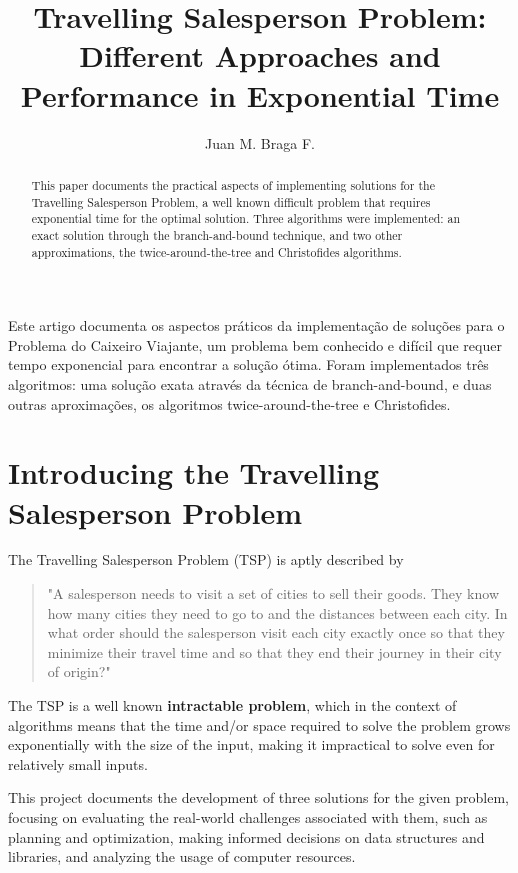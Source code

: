 \documentclass[12pt]{article}
\title{Travelling Salesperson Problem:\\ Different Approaches and Performance in Exponential Time}
\author{Juan M. Braga F.\inst{1}}
\begin{document}
 

\maketitle

\begin{abstract}
  This paper documents the practical aspects of implementing solutions
  for the Travelling Salesperson Problem, a well known difficult problem that requires
  exponential time for the optimal solution. Three algorithms were implemented:
  an exact solution through the branch-and-bound technique, and two other approximations,
  the twice-around-the-tree and Christofides algorithms.
\end{abstract}
     
\begin{resumo} 
  Este artigo documenta os aspectos práticos da implementação de soluções
  para o Problema do Caixeiro Viajante, um problema bem conhecido e difícil que requer
  tempo exponencial para encontrar a solução ótima. Foram implementados três algoritmos:
  uma solução exata através da técnica de branch-and-bound, e duas outras aproximações,
  os algoritmos twice-around-the-tree e Christofides.
\end{resumo}


\section{Introducing the Travelling Salesperson Problem} \label{sec:intro}

The Travelling Salesperson Problem (TSP) is aptly described by \cite{brilliant_explanation} 

\begin{quote}
  "A salesperson needs to visit a set of cities to sell their goods. They know how 
  many cities they need to go to and the distances between each city. In what order 
  should the salesperson visit each city exactly once so that they minimize their 
  travel time and so that they end their journey in their city of origin?"
\end{quote}

The TSP is a well known \textbf{intractable problem}, which in the context of 
algorithms means that the time and/or space required to solve the problem grows 
exponentially with the size of the input, making it impractical to solve even for 
relatively small inputs.

This project documents the development of three solutions for the given problem, 
focusing on evaluating the real-world challenges associated with them, such as planning and 
optimization, making informed decisions on data structures and libraries, and 
analyzing the usage of computer resources.
\end{document}
